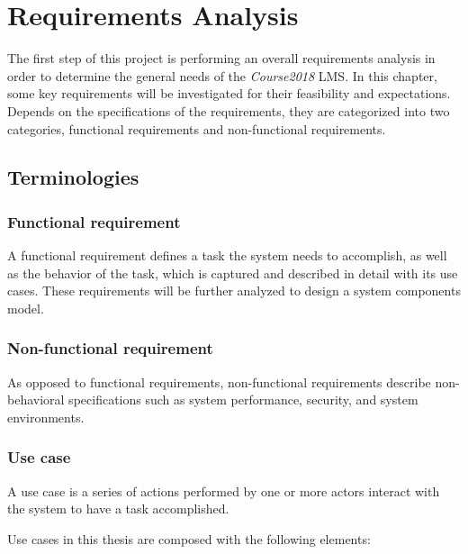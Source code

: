 

\chapter{Requirements Analysis}
\label{chap:REQS}

The first step of this project is performing an overall requirements analysis
in order to determine the general needs of the \emph{Course2018} LMS.
In this chapter, some key requirements will be investigated for their
feasibility and expectations.
Depends on the specifications of the requirements, they are categorized into
two categories, functional requirements and non-functional requirements.

\section{Terminologies}

\subsection{Functional requirement}
A functional requirement defines a task the system needs to accomplish,
as well as the behavior of the task, which is captured and described in detail
with its use cases.
These requirements will be further analyzed to design a system components
model.~\cite{functionalReqs}

\subsection{Non-functional requirement}
As opposed to functional requirements, non-functional requirements describe
non-behavioral specifications such as system performance, security, and system
environments.

\subsection{Use case}
A use case is a series of actions performed by one or more actors interact
with the system to have a task accomplished. \cite{useCase}

\medskip 

Use cases in this thesis are composed with the following elements:

